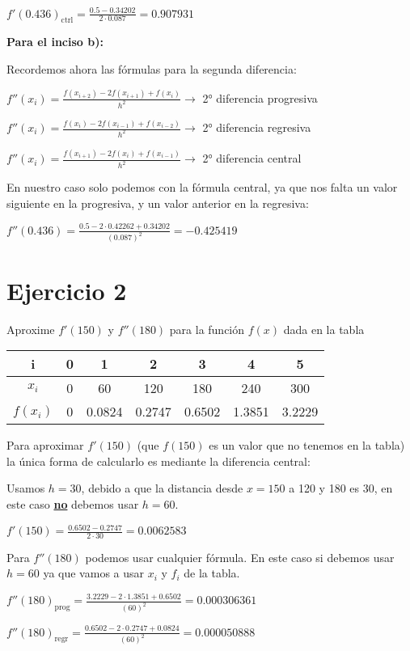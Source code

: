 \documentclass[11pt]{article}
\begin{document}
	$\displaystyle f'(0.436)_{\text{ctrl}}=\frac{0.5-0.34202}{2\cdot 0.087}=0.907931$
	
	\textbf{Para el inciso b):}
	
	Recordemos ahora las fórmulas para la segunda diferencia:
	
	$\displaystyle f''(x_i)=\frac{f(x_{i+2})-2f(x_{i+1})+f(x_i)}{h^2}\rightarrow$ 2° diferencia progresiva
	
	$\displaystyle f''(x_i)=\frac{f(x_{i})-2f(x_{i-1})+f(x_{i-2})}{h^2}\rightarrow$ 2° diferencia regresiva
	
	$\displaystyle f''(x_i)=\frac{f(x_{i+1})-2f(x_{i})+f(x_{i-1})}{h^2}\rightarrow$ 2° diferencia central
	
	En nuestro caso solo podemos con la fórmula central, ya que nos falta un valor siguiente en la progresiva, y un valor anterior en la regresiva:
	
	$\displaystyle f''(0.436)=\frac{0.5-2\cdot 0.42262 + 0.34202}{(0.087)^2}=-0.425419$
	
	\section{Ejercicio 2}
	Aproxime $f'(150)$ y $f''(180)$ para la función $f(x)$ dada en la tabla \\
	\begin{tabular}{|c|c|c|c|c|c|c|}
		\hline
		i & 0 & 1 & 2 & 3 & 4 & 5 \\
		\hline
		$x_i$ & 0 & 60 & 120 & 180 & 240 & 300\\
		\hline
		$f(x_i)$ & 0 & 0.0824 & 0.2747 & 0.6502 & 1.3851 & 3.2229\\
		\hline
	\end{tabular}

	Para aproximar $f'(150)$ (que $f(150)$ es un valor que no tenemos en la tabla) la única forma de calcularlo es mediante la diferencia central:
	
	Usamos $h=30$, debido a que la distancia desde $x=150$ a 120 y 180 es 30, en este caso \textbf{\underline{no}} debemos usar $h=60$.
	
	$\displaystyle f'(150)=\frac{0.6502-0.2747}{2\cdot 30}=0.0062583$
	
	Para $f''(180)$ podemos usar cualquier fórmula. En este caso si debemos usar $h=60$ ya que vamos a usar $x_i$ y $f_i$ de la tabla.
	
	$\displaystyle f''(180)_{\text{prog}}=\frac{3.2229-2\cdot 1.3851 + 0.6502}{(60)^2}=0.000306361$
	
	$\displaystyle f''(180)_{\text{regr}}=\frac{0.6502-2\cdot 0.2747 + 0.0824}{(60)^2}=0.000050888$
	
\end{document}
